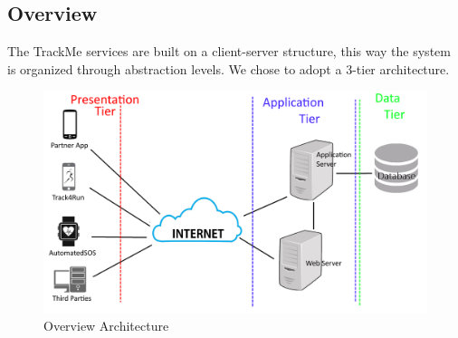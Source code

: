 \subsection{Overview}
The TrackMe services are built on a client-server structure, this way the system is organized through abstraction levels.
We chose to adopt a 3-tier architecture.
\\[0.2cm]
\begin{figure}[H]
\centering
\includegraphics[scale=0.18]{Images/Overview.png}
\caption{Overview Architecture }
\end{figure}

